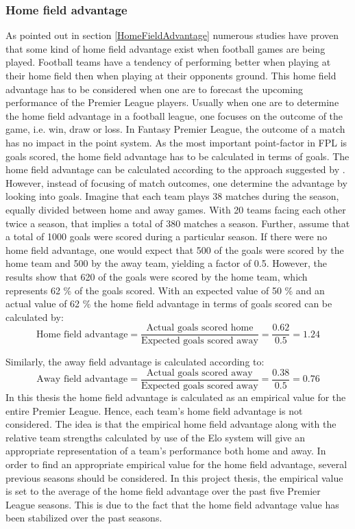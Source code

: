 \subsubsection{Home field advantage}
As pointed out in section \ref{HomeFieldAdvantage} numerous studies have proven that some kind of home field advantage exist when football games are being played. Football teams have a tendency of performing better when playing at their home field then when playing at their opponents ground. This home field advantage has to be considered when one are to forecast the upcoming performance of the Premier League players. 
\newpar
Usually when one are to determine the home field advantage in a football league, one focuses on the outcome of the game, i.e.  win, draw or loss. In Fantasy Premier League, the outcome of a match has no impact in the point system. As the most important point-factor in FPL is goals scored, the home field advantage has to be calculated in terms of goals. 
\newpar
The home field advantage can be calculated according to the approach suggested by \cite{Pollard}. However, instead of focusing of match outcomes, one determine the advantage by looking into goals. Imagine that each team plays 38 matches during the season, equally divided between home and away games. With 20 teams facing each other twice a season, that implies a total of 380 matches a season. Further, assume that a total of 1000 goals were scored during a particular season. If there were no home field advantage, one would expect that 500 of the goals were scored by the home team and 500 by the away team, yielding a factor of 0.5. However, the results show that 620 of the goals were scored by the home team, which represents 62 \% of the goals scored. With an expected value of 50 \% and an actual value of 62 \% the home field advantage in terms of goals scored can be calculated by: 
\begin{equation*}
    \textrm{Home field advantage} = \frac{\textrm{Actual goals scored home}}{\textrm{Expected goals scored away}} = \frac{0.62}{0.5} = 1.24 
\end{equation*}

Similarly, the away field advantage is calculated according to:
\begin{equation*}
    \textrm{Away field advantage} = \frac{\textrm{Actual goals scored away}}{\textrm{Expected goals scored away}} = \frac{0.38}{0.5} = 0.76
\end{equation*}
\newpar
In this thesis the home field advantage is calculated as an empirical value for the entire Premier League. Hence, each team's home field advantage is not considered. The idea is that the empirical home field advantage along with the relative team strengths calculated by use of the Elo system will give an appropriate representation of a team's performance both home and away. 
\newpar
In order to find an appropriate empirical value for the home field advantage, several previous seasons should be considered. In this project thesis, the empirical value is set to the average of the home field advantage over the past five Premier League seasons. This is due to the fact that the home field advantage value has been stabilized over the past seasons. 

